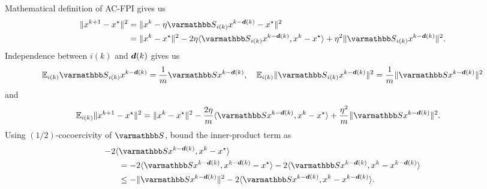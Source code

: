\documentclass[10pt,mathserif]{beamer}
\begin{document}
\begin{frame}
Mathematical definition of AC-FPI gives us
\begin{align*}
  \|x^{k+1} - x^\star\|^2 & = \|x^k - \eta \opS_{i(k)} x^{k-\vecdelay(k)} - x^\star\|^2 \nonumber\\
  & = \|x^k - x^\star\|^2 - 2\eta\langle \opS_{i(k)} x^{k-\vecdelay(k)} ,x^k - x^\star\rangle + \eta^2 \|\opS_{i(k)} x^{k-\vecdelay(k)}\|^2.
\end{align*}
Independence between $i(k)$ and $\boldsymbol{d}(k)$ gives us
\begin{align*}
  \EE_{i(k)} \opS_{i(k)} x^{k-\vecdelay(k)}= \frac{1}{m} \opS x^{k-\vecdelay(k)},\quad \EE_{i(k)} \|\opS_{i(k)} x^{k-\vecdelay(k)}\|^2 = \frac{1}{m} \|\opS x^{k-\vecdelay(k)}\|^2
\end{align*}
and
\begin{align}
  \EE_{i(k)}\|x^{k+1} - x^\star\|^2 & = \|x^k - x^\star\|^2 - \frac{2\eta}{m}\langle \opS x^{k-\vecdelay(k)} ,x^k - x^\star\rangle + \frac{\eta^2}{m} \|\opS x^{k-\vecdelay(k)}\|^2.\label{eq:exp1}
\end{align}
Using $(1/2)$-cocoercivity of $\opS$, bound the inner-product term as
\begin{align}
  - 2\langle &\opS x^{k-\vecdelay(k)} ,x^k - x^\star\rangle \nonumber\\&= -2 \langle \opS x^{k-\vecdelay(k)} , x^{k-\vecdelay(k)} - x^\star\rangle -2 \langle \opS x^{k-\vecdelay(k)} ,x^k- x^{k-\vecdelay(k)}\rangle \nonumber\\
  &\le - \|\opS x^{k-\vecdelay(k)}\|^2 - 2\langle \opS  x^{k-\vecdelay(k)} ,x^k-{x}^{k-\vecdelay(k)}\rangle.\label{eq:exp2}
\end{align}

\end{frame}
\end{document}
